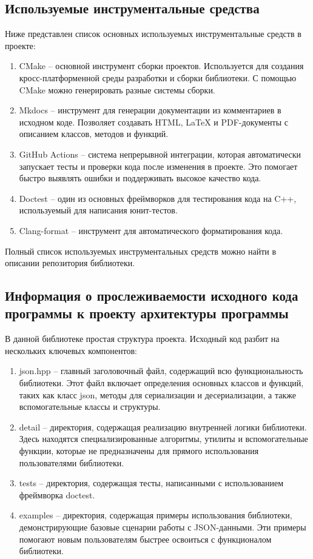\subsection{Используемые инструментальные средства}

Ниже представлен список основных используемых инструментальные средств в проекте:

\begin{enumerate}
    \item CMake -- основной инструмент сборки проектов. Используется для создания кросс-платформенной среды разработки и сборки библиотеки. С помощью CMake можно генерировать разные системы сборки.
    \item Mkdocs -- инструмент для генерации документации из комментариев в исходном коде. Позволяет создавать HTML, LaTeX и PDF-документы с описанием классов, методов и функций.
    \item GitHub Actions -- система непрерывной интеграции, которая автоматически запускает тесты и проверки кода после изменения в проекте. Это помогает быстро выявлять ошибки и поддерживать высокое качество кода.
    \item Doctest -- один из основных фреймворков для тестирования кода на C++, используемый для написания юнит-тестов.
    \item Clang-format -- инструмент для автоматического форматирования кода.

\end{enumerate}

Полный список используемых инструментальных средств можно найти в описании репозитория библиотеки.

\subsection{Информация о прослеживаемости исходного кода программы к проекту архитектуры программы}

В данной библиотеке простая структура проекта. Исходный код разбит на нескольких ключевых компонентов:

\begin{enumerate}
    \item json.hpp -- главный заголовочный файл, содержащий всю функциональность библиотеки. Этот файл включает определения основных классов и функций, таких как класс json, методы для сериализации и десериализации, а также вспомогательные классы и структуры.
    \item detail -- директория, содержащая реализацию внутренней логики библиотеки. Здесь находятся специализированные алгоритмы, утилиты и вспомогательные функции, которые не предназначены для прямого использования пользователями библиотеки.
    \item tests -- директория, содержащая тесты, написанными с использованием фреймворка doctest.
    \item examples -- директория, содержащая примеры использования библиотеки, демонстрирующие базовые сценарии работы с JSON-данными. Эти примеры помогают новым пользователям быстрее освоиться с функционалом библиотеки.

\end{enumerate}

